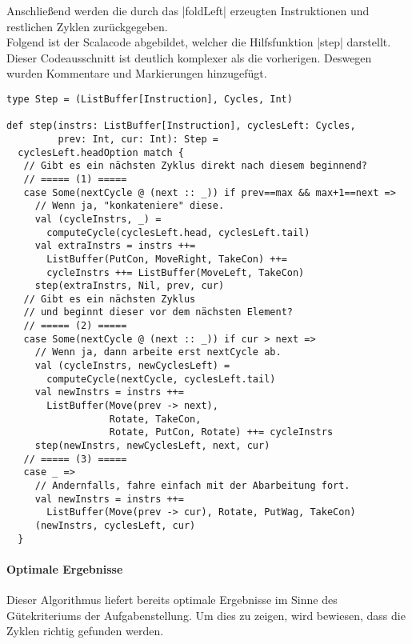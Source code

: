 Anschließend werden die durch das |foldLeft| erzeugten Instruktionen und restlichen Zyklen zurück\-ge\-ge\-ben.\\
Folgend ist der Scalacode abgebildet, welcher die Hilfsfunktion |step| darstellt.
Dieser Codeausschnitt ist deutlich komplexer als die vorherigen. Deswegen wurden Kommentare und Markierungen hinzugefügt.
\lstset{basicstyle=\ttfamily\small}
\begin{lstlisting}
type Step = (ListBuffer[Instruction], Cycles, Int)

def step(instrs: ListBuffer[Instruction], cyclesLeft: Cycles,
         prev: Int, cur: Int): Step =
  cyclesLeft.headOption match {
   // Gibt es ein nächsten Zyklus direkt nach diesem beginnend?
   // ===== (1) =====
   case Some(nextCycle @ (next :: _)) if prev==max && max+1==next =>
     // Wenn ja, "konkateniere" diese.
     val (cycleInstrs, _) =
       computeCycle(cyclesLeft.head, cyclesLeft.tail)
     val extraInstrs = instrs ++=
       ListBuffer(PutCon, MoveRight, TakeCon) ++=
       cycleInstrs ++= ListBuffer(MoveLeft, TakeCon)
     step(extraInstrs, Nil, prev, cur)
   // Gibt es ein nächsten Zyklus
   // und beginnt dieser vor dem nächsten Element?
   // ===== (2) =====
   case Some(nextCycle @ (next :: _)) if cur > next =>
     // Wenn ja, dann arbeite erst nextCycle ab.
     val (cycleInstrs, newCyclesLeft) =
       computeCycle(nextCycle, cyclesLeft.tail)
     val newInstrs = instrs ++=
       ListBuffer(Move(prev -> next),
                  Rotate, TakeCon,
                  Rotate, PutCon, Rotate) ++= cycleInstrs
     step(newInstrs, newCyclesLeft, next, cur)
   // ===== (3) =====
   case _ =>
     // Andernfalls, fahre einfach mit der Abarbeitung fort.
     val newInstrs = instrs ++=
       ListBuffer(Move(prev -> cur), Rotate, PutWag, TakeCon)
     (newInstrs, cyclesLeft, cur)
  }
\end{lstlisting}
\lstset{basicstyle=\ttfamily\normalsize}

\paragraph{Optimale Ergebnisse}
\label{opt_res}
Dieser Algorithmus liefert bereits optimale Ergebnisse im Sinne des Güte\-kri\-ter\-iums der Aufgabenstellung.
Um dies zu zeigen, wird bewiesen, dass die Zyklen richtig gefunden werden. \\


